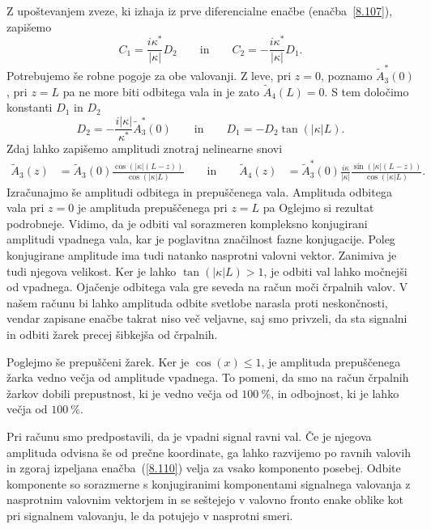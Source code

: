 Z upoštevanjem zveze, ki izhaja  iz prve diferencialne enačbe 
(enačba~\ref{8.107}), zapišemo
\begin{equation}
C_1 = \frac{i \kappa^*}{|\kappa|}D_2 \qquad
\textrm{in} \qquad 
C_2 = -\frac{i \kappa^*}{|\kappa|}D_1. 
\end{equation}
Potrebujemo še robne pogoje za obe valovanji. Z leve, pri $z=0$,
poznamo $\tilde{A}_{3}^{*}\left(0\right)$, pri $z=L$ pa ne more biti odbitega
vala in je zato $\tilde{A}_{4}\left(L\right)=0$. S tem določimo konstanti $D_{1}$
in $D_{2}$
\begin{equation}
D_2 = -\frac{i|\kappa|}{\kappa^*} \tilde{A}_3^*(0) \qquad
\textrm{in} \qquad 
D_1 = -D_2 \tan(|\kappa|L). 
\end{equation}
Zdaj lahko zapišemo amplitudi znotraj nelinearne snovi
\begin{align}
\tilde{A}_{3}\left(z\right) & =  \tilde{A}_3(0)
\frac{\cos\left(|\kappa|(L-z)\right)}{\cos\left(|\kappa|L\right)}
\qquad \mathrm{in} \qquad
\tilde{A}_{4}\left(z\right) & =  \tilde{A}_3^*(0)\frac{i \kappa}{|\kappa|}
\frac{\sin\left(|\kappa|(L-z)\right)}{\cos\left(|\kappa|L\right)}.
\label{8.109}
\end{align}
Izračunajmo še amplitudi odbitega in prepuščenega vala. Amplituda odbitega vala 
pri $z=0$ je 
amplituda prepuščenega pri $z = L$ pa
Oglejmo si rezultat podrobneje. Vidimo, da je odbiti val sorazmeren 
kompleksno konjugirani amplitudi vpadnega vala, kar je poglavitna značilnost
fazne konjugacije. 
Poleg konjugirane amplitude ima tudi natanko nasprotni valovni vektor. 
Zanimiva je tudi njegova velikost. Ker 
je lahko $\tan\left(|\kappa|L\right)>1$, je odbiti val lahko močnejši od vpadnega.
Ojačenje odbitega vala gre seveda na račun moči črpalnih
valov. V našem računu bi lahko amplituda odbite svetlobe narasla proti neskončnosti, 
vendar zapisane enačbe takrat niso več veljavne, saj smo privzeli, 
da sta signalni in odbiti žarek precej šibkejša od črpalnih.

Poglejmo še prepuščeni žarek. Ker je $\cos(x)\leq1$, je amplituda prepuščenega
žarka vedno večja od amplitude vpadnega. To pomeni, da smo na račun črpalnih žarkov
dobili prepustnost, ki je vedno večja od $100~\%$, in odbojnost, ki je lahko 
večja od $100~\%$.

Pri računu smo predpostavili, da je vpadni signal ravni val. Če je njegova
amplituda odvisna še od prečne koordinate, ga lahko razvijemo po ravnih
valovih in zgoraj izpeljana enačba~(\ref{8.110}) velja za vsako komponento posebej. 
Odbite komponente so sorazmerne s konjugiranimi komponentami signalnega valovanja
z nasprotnim valovnim vektorjem in se seštejejo v valovno fronto enake
oblike kot pri signalnem valovanju, le da potujejo v nasprotni smeri.

